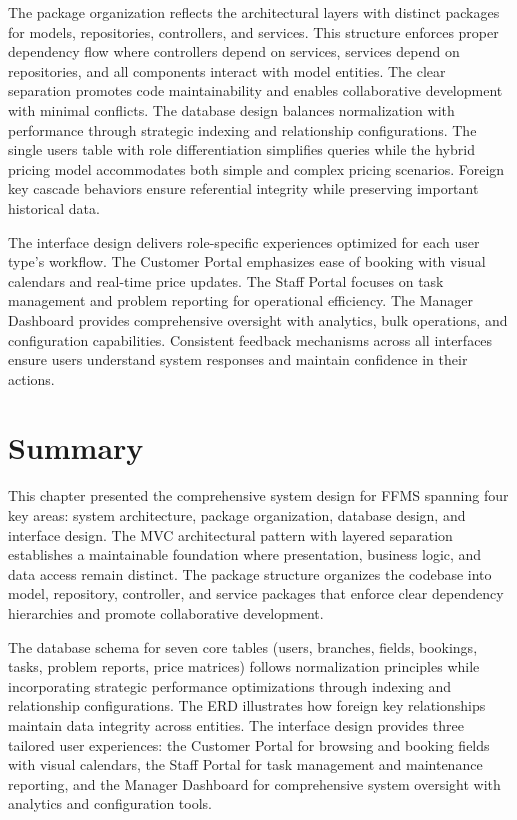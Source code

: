 The package organization reflects the architectural layers with distinct packages for models, repositories, controllers, and services. This structure enforces proper dependency flow where controllers depend on services, services depend on repositories, and all components interact with model entities. The clear separation promotes code maintainability and enables collaborative development with minimal conflicts. The database design balances normalization with performance through strategic indexing and relationship configurations. The single users table with role differentiation simplifies queries while the hybrid pricing model accommodates both simple and complex pricing scenarios. Foreign key cascade behaviors ensure referential integrity while preserving important historical data.

The interface design delivers role-specific experiences optimized for each user type's workflow. The Customer Portal emphasizes ease of booking with visual calendars and real-time price updates. The Staff Portal focuses on task management and problem reporting for operational efficiency. The Manager Dashboard provides comprehensive oversight with analytics, bulk operations, and configuration capabilities. Consistent feedback mechanisms across all interfaces ensure users understand system responses and maintain confidence in their actions.

\section{Summary}

This chapter presented the comprehensive system design for FFMS spanning four key areas: system architecture, package organization, database design, and interface design. The MVC architectural pattern with layered separation establishes a maintainable foundation where presentation, business logic, and data access remain distinct. The package structure organizes the codebase into model, repository, controller, and service packages that enforce clear dependency hierarchies and promote collaborative development.

The database schema for seven core tables (users, branches, fields, bookings, tasks, problem reports, price matrices) follows normalization principles while incorporating strategic performance optimizations through indexing and relationship configurations. The ERD illustrates how foreign key relationships maintain data integrity across entities. The interface design provides three tailored user experiences: the Customer Portal for browsing and booking fields with visual calendars, the Staff Portal for task management and maintenance reporting, and the Manager Dashboard for comprehensive system oversight with analytics and configuration tools.

